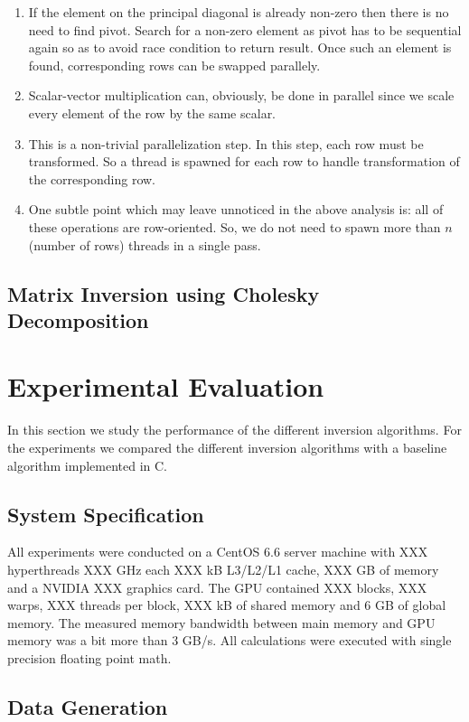 \documentclass[11pt]{article}
\begin{document}
\begin{enumerate}
        \item If the element on the principal diagonal is already non-zero then there is no need to find pivot. Search for a non-zero element as pivot has to be sequential again so as to avoid race condition to return result. Once such an element is found, corresponding rows can be swapped parallely.
        \item Scalar-vector multiplication can, obviously, be done in parallel since we scale every element of the row by the same scalar.
        \item This is a non-trivial parallelization step. In this step, each row must be transformed. So a thread is spawned for each row to handle transformation of the corresponding row.
		\item One subtle point which may leave unnoticed in the above analysis is: all of these operations are row-oriented. So, we do not need to spawn more than $n$(number of rows) threads in a single pass.
\end{enumerate}
\subsection{Matrix Inversion using Cholesky Decomposition}

\section{Experimental Evaluation}

In this section we study the performance of the different inversion algorithms. For the experiments we compared the different inversion algorithms with a baseline algorithm implemented in C.

\subsection{System Specification}

All experiments were conducted on a CentOS 6.6 server machine with XXX hyperthreads XXX GHz each XXX kB L3/L2/L1 cache, XXX GB of memory and a NVIDIA XXX graphics card. The GPU contained XXX blocks, XXX warps, XXX threads per block, XXX kB of shared memory and 6 GB of global memory. The measured memory bandwidth between main memory and GPU memory was a bit more than 3 GB/s. All calculations were executed with single precision floating point math.

\subsection{Data Generation}
\end{document}
